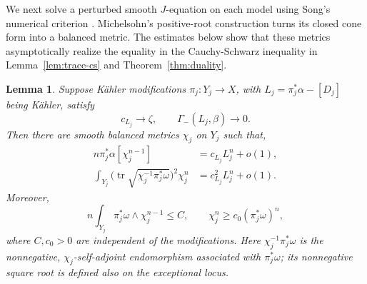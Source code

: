 \documentclass[reqno]{amsart}
\numberwithin{equation}{section}
\newtheorem{lemma}[theorem]{Lemma}
\theoremstyle{definition}
\DeclareMathOperator{\tr}{tr}
\begin{document}
We next solve a perturbed smooth $J$-equation on each model
using Song's numerical criterion \cite{S20}.
Michelsohn's positive-root construction
\cite[pp.~279--280]{M82} turns its closed cone form
into a balanced metric. The estimates below show that these
metrics asymptotically realize the equality in the Cauchy-Schwarz inequality in Lemma~\ref{lem:trace-cs} and Theorem~\ref{thm:duality}.
\begin{lemma}\label{lem:balanced-metrics}
Suppose K\"ahler modifications $\pi_j:Y_j\to X$, with $L_j=\pi_j^*\alpha-[D_j]$ being K\"ahler,  satisfy
\[
c_{L_j}\to\zeta,\qquad \Gamma_-(L_j,\beta)\to0.
\]
Then there are smooth balanced metrics $\chi_j$ on $Y_j$ such that,
\begin{equation}\label{eq:balanced-pairings}
\begin{aligned}
n\pi_j^*\alpha[\chi_j^{n-1}]&=c_{L_j}L_j^n+o(1),\\
\int_{Y_j}
 \bigl(\tr\sqrt{\chi_j^{-1}\pi_j^*\omega}\bigr)^2\chi_j^n
&=c_{L_j}^2L_j^n+o(1).
\end{aligned}
\end{equation}
Moreover, 
\begin{equation}\label{eq:balanced-mass}
n\int_{Y_j}\pi_j^*\omega\wedge \chi_j^{n-1}\le C,\qquad
\chi_j^n\ge c_0(\pi_j^*\omega)^n,
\end{equation}
where $C,c_0>0$ are independent of the modifications.
Here $\chi_j^{-1}\pi_j^*\omega$ is the nonnegative,
$\chi_j$-self-adjoint endomorphism associated with
$\pi_j^*\omega$; its nonnegative square root is defined also on
the exceptional locus.

\end{lemma}
\end{document}
